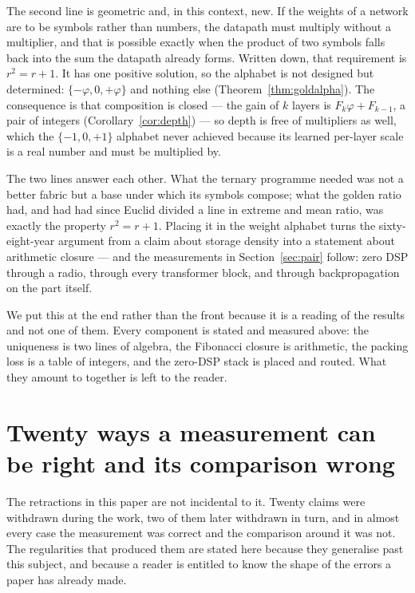\documentclass[11pt]{article}
\theoremstyle{definition}
\begin{document}
The second line is geometric and, in this context, new. If the weights of a
network are to be symbols rather than numbers, the datapath must multiply without
a multiplier, and that is possible exactly when the product of two symbols falls
back into the sum the datapath already forms. Written down, that requirement is
$r^2 = r + 1$. It has one positive solution, so the alphabet is not designed but
determined: $\{-\varphi, 0, +\varphi\}$ and nothing else
(Theorem~\ref{thm:goldalpha}). The consequence is that composition is closed ---
the gain of $k$ layers is $F_k\varphi + F_{k-1}$, a pair of integers
(Corollary~\ref{cor:depth}) --- so depth is free of multipliers as well, which the
$\{-1,0,+1\}$ alphabet never achieved because its learned per-layer scale is a
real number and must be multiplied by.

The two lines answer each other. What the ternary programme needed was not a
better fabric but a base under which its symbols compose; what the golden ratio
had, and had had since Euclid divided a line in extreme and mean ratio, was
exactly the property $r^2 = r + 1$. Placing it in the weight alphabet turns the
sixty-eight-year argument from a claim about storage density into a statement
about arithmetic closure --- and the measurements in Section~\ref{sec:pair}
follow: zero DSP through a radio, through every transformer block, and through
backpropagation on the part itself.

We put this at the end rather than the front because it is a reading of the
results and not one of them. Every component is stated and measured above:
the uniqueness is two lines of algebra, the Fibonacci closure is arithmetic, the
packing loss is a table of integers, and the zero-DSP stack is placed and routed.
What they amount to together is left to the reader.



\section{Twenty ways a measurement can be right and its comparison wrong}
\label{sec:selfcheck}

The retractions in this paper are not incidental to it. Twenty claims were
withdrawn during the work, two of them later withdrawn in turn, and in almost
every case the measurement was correct and the comparison around it was not. The
regularities that produced them are stated here because they generalise past this
subject, and because a reader is entitled to know the shape of the errors a paper
has already made.
\end{document}

